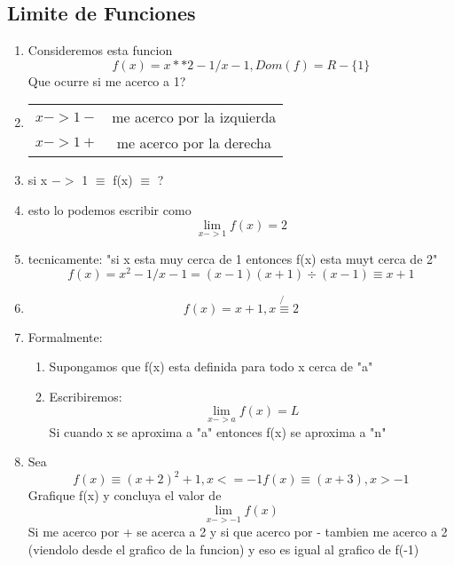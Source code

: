 \documentclass{article}
\begin{document}
        \subsection{Limite de Funciones}
            \begin{enumerate}
                \item Consideremos esta funcion \begin{equation}
                    f(x) = x**2 -1/ x-1 , Dom(f)=R-\{1\}
                \end{equation} Que ocurre si me acerco a 1?
                \item \begin{tabular} {c c}
                    $x->1- $& me acerco por la izquierda \\
                    $x->1+$ & me acerco por la derecha
                \end{tabular}
                \item si x $->$ 1 $\equiv$ f(x) $\equiv$ ?
                \item esto lo podemos escribir como
                \begin{equation}
                    \lim_{x->1} f(x)=2
                \end{equation}
                \item tecnicamente: "si x esta muy cerca de 1 entonces f(x) esta muyt cerca de 2"
                \begin{equation}
                    f(x) = x^2 -1 / x-1 = (x-1)(x+1)\div{(x-1)} \equiv x+1 
                \end{equation}
                \item 
                \begin{equation}
                    f(x) = x+1, x\not{\equiv}2
                \end{equation}
                \item Formalmente:
                \begin{enumerate}
                    \item Supongamos que f(x) esta definida para todo x cerca de "a" 
                    \item Escribiremos: \begin{equation}
                        \lim_{x->a} f(x) = L
                    \end{equation} Si cuando x se aproxima a "a" entonces f(x) se aproxima a "n"
                \end{enumerate}
                \item  Sea \begin{equation}
                    f(x) \equiv (x+2)^2 + 1, x<=-1   
                    f(x) \equiv (x+3), x>-1 
                    \end{equation}
                    Grafique f(x) y concluya el valor de \begin{equation}
                        \lim_{x->-1} f(x)
                    \end{equation} Si me acerco por + se acerca a 2 y si que acerco por - tambien me acerco a 2 (viendolo desde el grafico de la funcion)
                    y eso es igual al grafico de f(-1)
                    

\end{enumerate}
\end{document}
